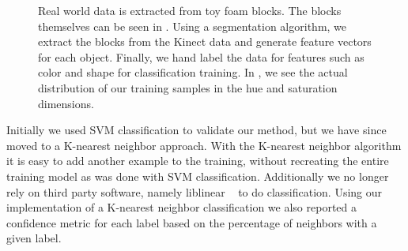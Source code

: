\documentclass[11pt]{article}
\begin{document}
\begin{figure}[h!]
\centering
{}
\caption{Real world data is extracted from toy foam blocks. The blocks
    themselves can be seen in . Using a segmentation
    algorithm, we extract the blocks from the Kinect data 
    and generate feature vectors for each object.
    Finally, we hand label the data for features such as color and shape for
    classification training. In , we see the actual
    distribution of our training samples in the hue and saturation
    dimensions.}
\label{fig:objects}
\end{figure}



Initially we used SVM classification to validate our method, but we have since
moved to a K-nearest neighbor approach.  With the K-nearest neighbor algorithm
it is easy to add another example to the training, without recreating the
entire training model as was done with SVM classification.  Additionally we no
longer rely on third party software, namely liblinear ~\cite{LIBLINEAR} to do
classification.  Using our implementation of a K-nearest neighbor
classification we also reported a confidence metric for each label based on the
percentage of neighbors with a given label.
\end{document}
